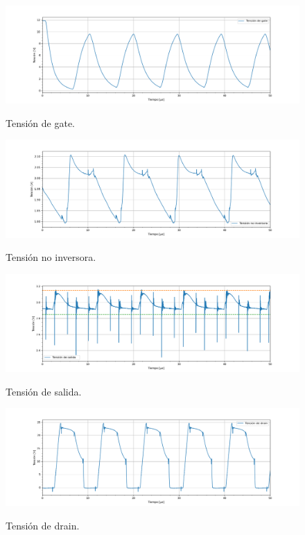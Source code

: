 \begin{figure}[H]
	\centering
	\includegraphics[width=0.9\linewidth]{ImagenesParteIV/Vgs.png}
	\label{fig:vgs_4}
	\caption{Tensión de gate.}
\end{figure}
\begin{figure}[H]
	\centering
	\includegraphics[width=0.9\linewidth]{ImagenesParteIV/Vni.png}
	\label{fig:vni_4}
	\caption{Tensión no inversora.}
\end{figure}
\begin{figure}[H]
	\centering
	\includegraphics[width=0.9\linewidth]{ImagenesParteIV/Vout.png}
	\label{fig:vout_4}
	\caption{Tensión de salida.}
\end{figure}
\begin{figure}[H]
	\centering
	\includegraphics[width=0.9\linewidth]{ImagenesParteIV/Vds.png}
	\label{fig:vds_4}
	\caption{Tensión de drain.}
\end{figure}

